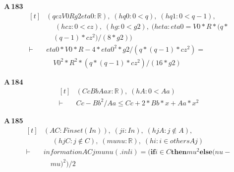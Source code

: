 \noindent\textbf{A\,183}\quad{}
{\footnotesize\[ \begin{aligned}[t]
&(\mathit{q} \mathit{cz} \mathit{V0} \mathit{R} \mathit{g2} \mathit{eta0} : \mathbb{R} ),\; (\mathit{hq0} : 0 < \mathit{q}),\; (\mathit{hq1} : 0 < \mathit{q}-1),\\
&\quad \; (\mathit{hcz} : 0 < \mathit{cz}),\; (\mathit{hg} : 0 < \mathit{g2}),\; (\mathit{heta} : \mathit{eta0} = \mathit{V0}*\mathit{R}*(\mathit{q}*\\
&\quad (\mathit{q}-1)*\mathit{cz}^{2})/(8*\mathit{g2}))\\
\vdash\;&\mathit{eta0}*\mathit{V0}*\mathit{R}-4*\mathit{eta0}^{2}*\mathit{g2}/(\mathit{q}*(\mathit{q}-1)*\mathit{cz}^{2}) =\\
&\quad \mathit{V0}^{2}*\mathit{R}^{2}*(\mathit{q}*(\mathit{q}-1)*\mathit{cz}^{2})/(16*\mathit{g2})
\end{aligned} \]}

\noindent\textbf{A\,184}\quad{}
{\footnotesize\[ \begin{aligned}[t]
&(\mathit{Cc} \mathit{Bb} \mathit{Aa} \mathit{x} : \mathbb{R} ),\; (\mathit{hA} : 0 < \mathit{Aa})\\
\vdash\;&\mathit{Cc}-\mathit{Bb}^{2}/\mathit{Aa} \leq \mathit{Cc}+2*\mathit{Bb}*\mathit{x}+\mathit{Aa}*\mathit{x}^{2}
\end{aligned} \]}

\noindent\textbf{A\,185}\quad{}
{\footnotesize\[ \begin{aligned}[t]
&(\mathit{A} \mathit{C} : \mathit{Finset} (\mathit{I} \mathit{n})),\; (\mathit{j} \mathit{i} : \mathit{I} \mathit{n}),\; (\mathit{hjA} : \mathit{j} \notin \mathit{A}),\\
&\quad \; (\mathit{hjC} : \mathit{j} \notin \mathit{C}),\; (\mathit{mu} \mathit{nu} : \mathbb{R} ),\; (\mathit{hi} : \mathit{i} \in \mathit{others} \mathit{A} \mathit{j})\\
\vdash\;&\mathit{information} \mathit{A} \mathit{C} \mathit{j} \mathit{mu} \mathit{nu} (.\mathit{inl} \mathit{i}) = (\mathbf{if} \mathit{i} \in \mathit{C} \mathbf{then} \mathit{mu}^{2} \mathbf{else} (\mathit{nu}-\\
&\quad \mathit{mu})^{2})/2
\end{aligned} \]}

